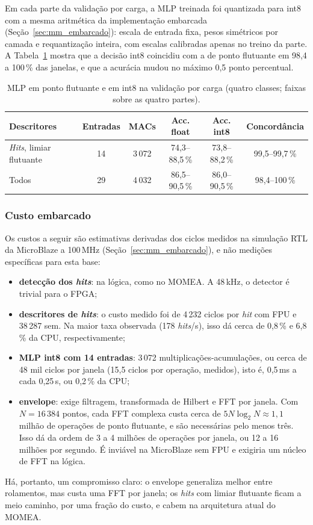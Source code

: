 Em cada parte da validação por carga, a MLP treinada foi quantizada para int8 com a mesma aritmética da implementação embarcada (Seção~\ref{sec:mm_embarcado}): escala de entrada fixa, pesos simétricos por camada e requantização inteira, com escalas calibradas apenas no treino da parte. A Tabela~\ref{cwru:tab:int8} mostra que a decisão int8 coincidiu com a de ponto flutuante em 98,4 a 100\,\% das janelas, e que a acurácia mudou no máximo 0,5 ponto percentual.

\begin{table}[htbp]
	\centering
	\small
	\caption{MLP em ponto flutuante e em int8 na validação por carga (quatro classes; faixas sobre as quatro partes).}
	\label{cwru:tab:int8}
	\setlength{\tabcolsep}{4pt}
	\begin{tabular}{lccccc}
		\toprule
		\textbf{Descritores} & \textbf{Entradas} & \textbf{MACs} & \textbf{Acc. float} & \textbf{Acc. int8} & \textbf{Concordância} \\
		\midrule
		\textit{Hits}, limiar flutuante & 14 & 3\,072 & 74,3--88,5\,\% & 73,8--88,2\,\% & 99,5--99,7\,\% \\
		Todos & 29 & 4\,032 & 86,5--90,5\,\% & 86,0--90,5\,\% & 98,4--100\,\% \\
		\bottomrule
	\end{tabular}
\end{table}

\subsubsection{Custo embarcado}

Os custos a seguir são estimativas derivadas dos ciclos medidos na simulação RTL da MicroBlaze a 100\,MHz (Seção~\ref{sec:mm_embarcado}), e não medições específicas para esta base:
\begin{itemize}
	\item \textbf{detecção dos \textit{hits}}: na lógica, como no MOMEA. A 48\,kHz, o detector é trivial para o FPGA;
	\item \textbf{descritores de \textit{hits}}: o custo medido foi de 4\,232 ciclos por \textit{hit} com FPU e 38\,287 sem. Na maior taxa observada (178 \textit{hits}/s), isso dá cerca de 0,8\,\% e 6,8\,\% da CPU, respectivamente;
	\item \textbf{MLP int8 com 14 entradas}: 3\,072 multiplicações-acumulações, ou cerca de 48 mil ciclos por janela (15,5 ciclos por operação, medidos), isto é, 0,5\,ms a cada 0,25\,s, ou 0,2\,\% da CPU;
	\item \textbf{envelope}: exige filtragem, transformada de Hilbert e FFT por janela. Com \(N = 16\,384\) pontos, cada FFT complexa custa cerca de \(5N\log_2 N \approx 1{,}1\) milhão de operações de ponto flutuante, e são necessárias pelo menos três. Isso dá da ordem de 3 a 4 milhões de operações por janela, ou 12 a 16 milhões por segundo. É inviável na MicroBlaze sem FPU e exigiria um núcleo de FFT na lógica.
\end{itemize}
Há, portanto, um compromisso claro: o envelope generaliza melhor entre rolamentos, mas custa uma FFT por janela; os \textit{hits} com limiar flutuante ficam a meio caminho, por uma fração do custo, e cabem na arquitetura atual do MOMEA.


